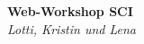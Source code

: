 \documentclass[12pt]{article}
\begin{document}
\begin{center}
\Large\textbf{Web-Workshop SCI}\\
\large\textit{Lotti, Kristin und Lena}
\end{center}
\end{document}
